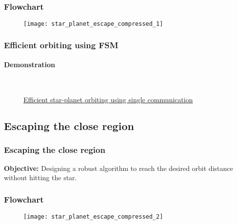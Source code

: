 \begin{frame}
\frametitle{Flowchart}
\begin{figure}[H]
	\centering
	\texttt{[image: star\_planet\_escape\_compressed\_1]}
\end{figure}
\end{frame}

\begin{frame}
\frametitle{Efficient orbiting using FSM}
\framesubtitle{Demonstration}
	\begin{figure}[H]
		\begin{center}
		\\
		\hspace{5cm}
		\caption{\href{https://youtu.be/LRgOzhAJI1k}{Efficient star-planet orbiting using single communication}}
		\label{fig:shape_formation_demo}
	\end{center}
	\end{figure}
\end{frame}

\subsection{Escaping the close region}
\begin{frame}
\frametitle{Escaping the close region}
\textbf{Objective:} Designing a robust algorithm to reach the desired orbit distance without hitting the star.
\end{frame}

\begin{frame}
\frametitle{Flowchart}
\begin{figure}[H]
	\centering
	\texttt{[image: star\_planet\_escape\_compressed\_2]}
\end{figure}
\end{frame}

